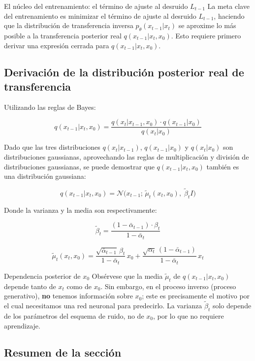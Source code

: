 \documentclass[a4paper]{article}
\begin{document}
\begin{importantbox}{El núcleo del entrenamiento: el término de ajuste al desruido $L_{t-1}$}
La meta clave del entrenamiento es minimizar el término de ajuste al desruido $L_{t-1}$, haciendo que la distribución de transferencia inversa $p_\theta(x_{t-1}|x_t)$ se aproxime lo más posible a la transferencia posterior real $q(x_{t-1}|x_t, x_0)$. Esto requiere primero derivar una expresión cerrada para $q(x_{t-1}|x_t, x_0)$.
\end{importantbox}

\subsection{Derivación de la distribución posterior real de transferencia}

Utilizando las reglas de Bayes:

$$q(x_{t-1}|x_t, x_0) = \frac{q(x_t|x_{t-1}, x_0) \cdot q(x_{t-1}|x_0)}{q(x_t|x_0)}$$

Dado que las tres distribuciones $q(x_t|x_{t-1})$, $q(x_{t-1}|x_0)$ y $q(x_t|x_0)$ son distribuciones gaussianas, aprovechando las reglas de multiplicación y división de distribuciones gaussianas, se puede demostrar que $q(x_{t-1}|x_t, x_0)$ también es una distribución gaussiana:

$$q(x_{t-1}|x_t, x_0) = \mathcal{N}\big(x_{t-1};\, \tilde{\mu}_t(x_t, x_0),\; \tilde{\beta}_t I\big)$$

Donde la varianza y la media son respectivamente:

$$\tilde{\beta}_t = \frac{(1 - \bar{\alpha}_{t-1}) \cdot \beta_t}{1 - \bar{\alpha}_t}$$

$$\tilde{\mu}_t(x_t, x_0) = \frac{\sqrt{\bar{\alpha}_{t-1}}\, \beta_t}{1 - \bar{\alpha}_t}\, x_0 + \frac{\sqrt{\alpha_t}\, (1 - \bar{\alpha}_{t-1})}{1 - \bar{\alpha}_t}\, x_t$$

\begin{warningbox}{Dependencia posterior de $x_0$}
Obsérvese que la media $\tilde{\mu}_t$ de $q(x_{t-1}|x_t, x_0)$ depende tanto de $x_t$ como de $x_0$. Sin embargo, en el proceso inverso (proceso generativo), \textbf{no} tenemos información sobre $x_0$; este es precisamente el motivo por el cual necesitamos una red neuronal para predecirlo. La varianza $\tilde{\beta}_t$ solo depende de los parámetros del esquema de ruido, no de $x_0$, por lo que no requiere aprendizaje.
\end{warningbox}

\subsection{Resumen de la sección}
\end{document}
